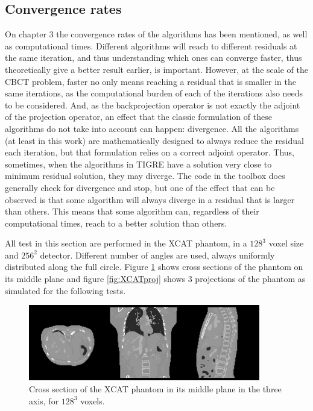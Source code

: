 \subsection{Convergence rates}

On chapter 3 the convergence rates of the algorithms has been mentioned, as well as computational times. Different algorithms will reach to different residuals at the same iteration, and thus understanding which ones can converge faster, thus theoretically give a better result earlier, is important. However, at the scale of the CBCT problem, faster no only means reaching a residual that is smaller in the same iterations, as the computational burden of each of the iterations also needs to be considered. And, as the backprojection operator is not exactly the adjoint of the projection operator, an effect that the classic formulation of these algorithms do not take into account can happen: divergence. All the algorithms (at least in this work) are mathematically designed to always reduce the residual each iteration, but that formulation relies on a correct adjoint operator. Thus, sometimes, when the algorithms in TIGRE have a solution very close to minimum residual solution, they may diverge. The code in the toolbox does generally check for divergence and stop, but one of the effect that can be observed is that some algorithm will always diverge in a residual that is larger than others. This means that some algorithm can, regardless of their computational times, reach to a better solution than others.

All test in this section are performed in the XCAT phantom\cite{XCAT}, in a $128^3$ voxel size and $256^2$ detector. Different number of angles are used, always uniformly distributed along the full circle. Figure \ref{fig:XCAT} shows cross sections of the phantom on its middle plane and figure \ref{fig:XCATproj} shows 3 projections of the phantom as simulated for the following tests. 

\begin{figure}[h]
\begin{center}

\includegraphics[width=0.9\textwidth]{Applications/XCAT.png} 
\end{center}

\caption[Cross section of the XCAT phantom]{\label{fig:XCAT} Cross section of the XCAT phantom in its middle plane in the three axis, for $128^3$ voxels.} 
\end{figure}

